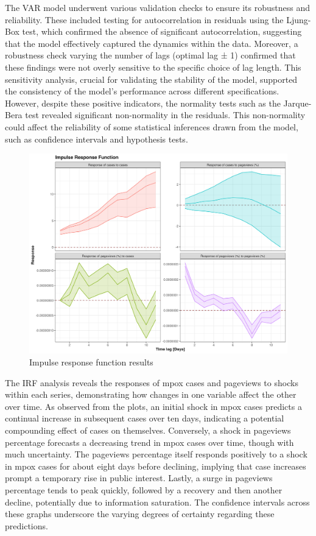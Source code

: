 \documentclass[
  12pt,
]{article}
\begin{document}
The VAR model underwent various validation checks to ensure its
robustness and reliability. These included testing for autocorrelation
in residuals using the Ljung-Box test, which confirmed the absence of
significant autocorrelation, suggesting that the model effectively
captured the dynamics within the data. Moreover, a robustness check
varying the number of lags (optimal lag ± 1) confirmed that these
findings were not overly sensitive to the specific choice of lag length.
This sensitivity analysis, crucial for validating the stability of the
model, supported the consistency of the model's performance across
different specifications. However, despite these positive indicators,
the normality tests such as the Jarque-Bera test revealed significant
non-normality in the residuals. This non-normality could affect the
reliability of some statistical inferences drawn from the model, such as
confidence intervals and hypothesis tests.~

\begin{figure}[H]

{\centering \includegraphics{images/impulse-response-function.png}

}

\caption{Impulse response function results}

\end{figure}%

The IRF analysis reveals the responses of mpox cases and pageviews to
shocks within each series, demonstrating how changes in one variable
affect the other over time. As observed from the plots, an initial shock
in mpox cases predicts a continual increase in subsequent cases over ten
days, indicating a potential compounding effect of cases on themselves.
Conversely, a shock in pageviews percentage forecasts a decreasing trend
in mpox cases over time, though with much uncertainty. The pageviews
percentage itself responds positively to a shock in mpox cases for about
eight days before declining, implying that case increases prompt a
temporary rise in public interest. Lastly, a surge in pageviews
percentage tends to peak quickly, followed by a recovery and then
another decline, potentially due to information saturation. The
confidence intervals across these graphs underscore the varying degrees
of certainty regarding these predictions.
\end{document}

